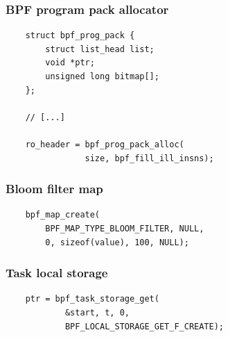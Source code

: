 \documentclass[usenames,dvipsnames, 18pt, compress, aspectratio=169]{beamer}
\begin{document}
\begin{frame}[fragile]{}
    \frametitle{BPF program pack allocator}

    \begin{center}
        \begin{verbatim}
    struct bpf_prog_pack {
        struct list_head list;
        void *ptr;
        unsigned long bitmap[];
    };

    // [...]

    ro_header = bpf_prog_pack_alloc(
                size, bpf_fill_ill_insns);
        \end{verbatim}
    \end{center}
\end{frame}

\begin{frame}[fragile]{}
    \frametitle{Bloom filter map}

    \begin{center}
        \begin{verbatim}
    bpf_map_create(
        BPF_MAP_TYPE_BLOOM_FILTER, NULL,
        0, sizeof(value), 100, NULL);
        \end{verbatim}
    \end{center}
\end{frame}

\begin{frame}[fragile]{}
    \frametitle{Task local storage}

    \begin{center}
        \begin{verbatim}
    ptr = bpf_task_storage_get(
            &start, t, 0,
            BPF_LOCAL_STORAGE_GET_F_CREATE);
        \end{verbatim}
    \end{center}
\end{frame}
\end{document}
